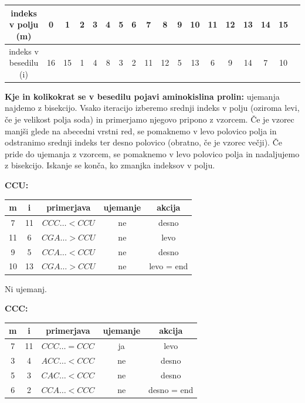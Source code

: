 \documentclass{article}
\begin{document}
\begin{enumerate}
\begin{enumerate}
				\begin{center}
					\begin{tabular}{|c||c|c|c|c|c|c|c|c|c|c|c|c|c|c|c|c|c|}
						\hline
						indeks v polju (m) & 0 & 1 & 2 & 3 & 4 & 5 & 6 & 7 & 8 & 9 & 10 & 11 & 12 & 13 & 14 & 15 \\
						\hline
						indeks v besedilu (i) & 16 & 15 & 1 & 4 & 8 & 3 & 2 & 11 & 12 & 5 & 13 & 6 & 9 & 14 & 7 & 10 \\
						\hline
					\end{tabular}
				\end{center}

				\textbf{Kje in kolikokrat se v besedilu pojavi aminokislina prolin:} ujemanja najdemo
				z bisekcijo. Vsako iteracijo izberemo srednji indeks v polju (oziroma levi, če je
				velikost polja soda) in primerjamo njegovo pripono z vzorcem. Če je vzorec manjši glede
				na abecedni vrstni red, se pomaknemo v levo polovico polja in odstranimo srednji indeks
				ter desno polovico (obratno, če je vzorec večji). Če pride do ujemanja z vzorcem, se
				pomaknemo v levo polovico polja in nadaljujemo z bisekcijo. Iskanje se konča, ko zmanjka
				indeksov v polju.

				\textbf{CCU:}

				\begin{center}
					\begin{tabular}{|c|c||c|c|c|}
						\hline
						m & i & primerjava & ujemanje & akcija \\
						\hline
						\hline
						7 & 11 & $CCC\dots < CCU$ & ne & desno \\
						\hline
						11 & 6 & $CGA\dots > CCU$ & ne & levo \\
						\hline
						9 & 5 & $CCA\dots < CCU$ & ne & desno \\
						\hline
						10 & 13 & $CGA\dots > CCU$ & ne & levo = end \\
						\hline
					\end{tabular}

					Ni ujemanj.
				\end{center}

				\textbf{CCC:}

				\begin{center}
					\begin{tabular}{|c|c||c|c|c|}
						\hline
						m & i & primerjava & ujemanje & akcija \\
						\hline
						\hline
						7 & 11 & $CCC\dots = CCC$ & ja & levo \\
						\hline
						3 & 4 & $ACC\dots < CCC$ & ne & desno \\
						\hline
						5 & 3 & $CAC\dots < CCC$ & ne & desno \\
						\hline
						6 & 2 & $CCA\dots < CCC$ & ne & desno = end \\
						\hline
					\end{tabular}


\end{center}
\end{enumerate}
\end{enumerate}
\end{document}
